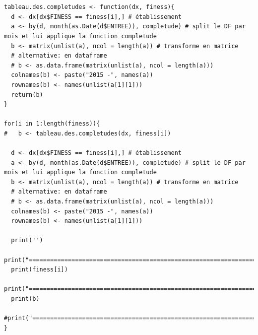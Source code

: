 \documentclass[]{article}
\begin{document}
\begin{verbatim}


tableau.des.completudes <- function(dx, finess){
  d <- dx[dx$FINESS == finess[i],] # établissement
  a <- by(d, month(as.Date(d$ENTREE)), completude) # split le DF par mois et lui applique la fonction completude
  b <- matrix(unlist(a), ncol = length(a)) # transforme en matrice
  # alternative: en dataframe
  # b <- as.data.frame(matrix(unlist(a), ncol = length(a)))
  colnames(b) <- paste("2015 -", names(a))
  rownames(b) <- names(unlist(a[1][1]))
  return(b)
}

for(i in 1:length(finess)){
#   b <- tableau.des.completudes(dx, finess[i])
  
  d <- dx[dx$FINESS == finess[i],] # établissement
  a <- by(d, month(as.Date(d$ENTREE)), completude) # split le DF par mois et lui applique la fonction completude
  b <- matrix(unlist(a), ncol = length(a)) # transforme en matrice
  # alternative: en dataframe
  # b <- as.data.frame(matrix(unlist(a), ncol = length(a)))
  colnames(b) <- paste("2015 -", names(a))
  rownames(b) <- names(unlist(a[1][1]))
  
  print('')
  print("=====================================================================")
  print(finess[i])
  print("=====================================================================")
  print(b)
  #print("=====================================================================")
}
\end{verbatim}
\end{document}
